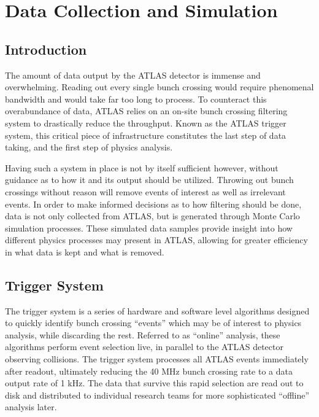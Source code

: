 \chapter{Data Collection and Simulation} \label{chapter:data}

\section{Introduction}

    The amount of data output by the ATLAS detector is immense and overwhelming.
    Reading out every single bunch crossing would require phenomenal bandwidth and would take far too long to process.
    To counteract this overabundance of data, ATLAS relies on an on-site bunch crossing filtering system to drastically reduce the throughput.
    Known as the ATLAS trigger system, this critical piece of infrastructure constitutes the last step of data taking,
        and the first step of physics analysis.
        
    Having such a system in place is not by itself sufficient however,
        without guidance as to how it and its output should be utilized.
    Throwing out bunch crossings without reason will remove events of interest as well as irrelevant events.
    In order to make informed decisions as to how filtering should be done,
        data is not only collected from ATLAS, but is generated through Monte Carlo simulation processes.
    These simulated data samples provide insight into how different physics processes may present in ATLAS,
        allowing for greater efficiency in what data is kept and what is removed.


\section{Trigger System}

    The trigger system is a series of hardware and software level algorithms designed to quickly identify bunch crossing ``events'' which may be of interest to physics analysis, while discarding the rest.
    Referred to as ``online'' analysis, these algorithms perform event selection live, in parallel to the ATLAS detector observing collisions.
    The trigger system processes all ATLAS events immediately after readout, ultimately reducing the 40 MHz bunch crossing rate to a data output rate of 1 kHz.
    The data that survive this rapid selection are read out to disk and distributed to individual research teams for more sophisticated ``offline'' analysis later.
    
